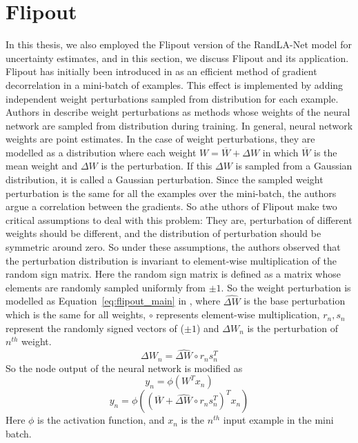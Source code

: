 \section{Flipout}
\label{sec:meth_flipout}
In this thesis, we also employed the Flipout version of the RandLA-Net model for uncertainty estimates, and in this section, we discuss Flipout and its application.
Flipout has initially been introduced in \cite{Flipout} as an efficient method of gradient decorrelation in a mini-batch of examples.
This effect is implemented by adding independent weight perturbations sampled from distribution for each example.
Authors in \cite{Flipout} describe weight perturbations as methods whose weights of the neural network are sampled from distribution during training.
In general, neural network weights are point estimates. In the case of weight perturbations, they are modelled as a distribution where each weight $W=\overline{W}+\Delta W$ in which $\overline{W}$ is the mean weight and $\Delta W$ is the perturbation.
If this $\Delta W$ is sampled from a Gaussian distribution, it is called a Gaussian perturbation.
Since the sampled weight perturbation is the same for all the examples over the mini-batch, the authors argue a correlation between the gradients.
So athe uthors of Flipout make two critical assumptions to deal with this problem:
They are, perturbation of different weights should be different, and the distribution of perturbation should be symmetric around zero.
So under these assumptions, the authors observed that the perturbation distribution is invariant to element-wise multiplication of the random sign matrix.
Here the random sign matrix is defined as a matrix whose elements are randomly sampled uniformly from $\pm 1$. 
So the weight perturbation is modelled as Equation~\ref{eq:flipout_main} in \cite{Flipout}, where $\widehat{\Delta W}$ is the base perturbation which is the same for all weights, $\circ$ represents element-wise multiplication, $r_n, s_n$ represent the randomly signed vectors of ($\pm 1$) and $\Delta W_n$ is the perturbation of $n^{th}$ weight.
\begin{equation}
    \Delta W_n = \widehat{\Delta W} \circ r_n s_{n}^T
    \label{eq:flipout_main}
\end{equation}
So the node output of the neural network is modified as 
$$y_n = \phi(W^T x_n) $$
$$y_n = \phi((\overline{W}+\widehat{\Delta W} \circ r_n s_{n}^T)^Tx_n)$$
Here $\phi$ is the activation function, and $x_n$ is the $n^{th}$ input example in the mini batch.
